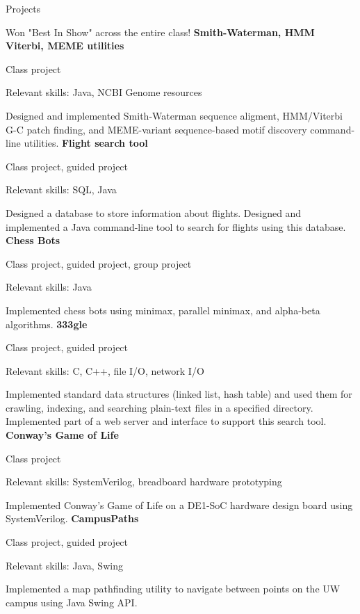 \begin{rubric}{Projects}
	\par Won "Best In Show" across the entire class!
\entry*[2018] %
	\textbf{Smith-Waterman, HMM Viterbi, MEME utilities} %
	\par Class project
	\par Relevant skills: Java, NCBI Genome resources
	\par Designed and implemented Smith-Waterman sequence aligment, HMM/Viterbi G-C patch finding, and MEME-variant sequence-based motif discovery command-line utilities.
\entry*[2018] %
	\textbf{Flight search tool} %
	\par Class project, guided project
	\par Relevant skills: SQL, Java
	\par Designed a database to store information about flights. Designed and implemented a Java command-line tool to search for flights using this database.
\entry*[2018] %
	\textbf{Chess Bots} %
	\par Class project, guided project, group project
	\par Relevant skills: Java
	\par Implemented chess bots using minimax, parallel minimax, and alpha-beta algorithms.
\entry*[2018] %
	\textbf{333gle} %
	\par Class project, guided project
	\par Relevant skills: C, C++, file I/O, network I/O
	\par Implemented standard data structures (linked list, hash table) and used them for crawling, indexing, and searching plain-text files in a specified directory. Implemented part of a web server and interface to support this search tool.
\entry*[2018] %
	\textbf{Conway's Game of Life} %
	\par Class project
	\par Relevant skills: SystemVerilog, breadboard hardware prototyping
	\par Implemented Conway's Game of Life on a DE1-SoC hardware design board using SystemVerilog.
\entry*[2018] %
	\textbf{CampusPaths} %
	\par Class project, guided project
	\par Relevant skills: Java, Swing
	\par Implemented a map pathfinding utility to navigate between points on the UW campus using Java Swing API.
\entry*[2017] %

\end{rubric}
